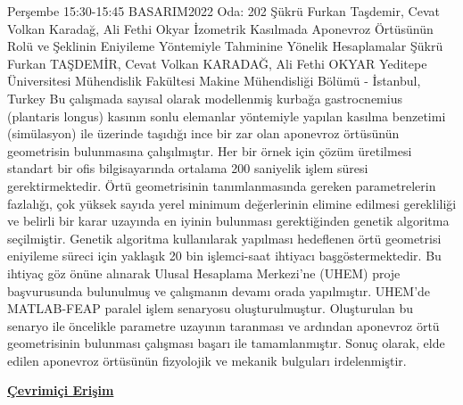 
    \begin{abstract_basarim}
    {Perşembe 15:30-15:45}
    {BASARIM2022}
    {Oda: 202}
    {Şükrü Furkan Taşdemir, Cevat Volkan Karadağ, Ali Fethi Okyar}
    {İzometrik Kasılmada Aponevroz Örtüsünün Rolü ve Şeklinin Eniyileme Yöntemiyle Tahminine Yönelik Hesaplamalar}
    {%
    Şükrü Furkan TAŞDEMİR, Cevat Volkan KARADAĞ, Ali Fethi OKYAR}
    {%
    }
    {%
    Yeditepe Üniversitesi Mühendislik Fakültesi Makine Mühendisliği Bölümü - İstanbul, Turkey}
    Bu çalışmada sayısal olarak modellenmiş kurbağa gastrocnemius (plantaris longus) kasının sonlu elemanlar yöntemiyle yapılan kasılma benzetimi (simülasyon) ile üzerinde taşıdığı ince bir zar olan aponevroz örtüsünün geometrisin bulunmasına çalışılmıştır. Her bir örnek için çözüm üretilmesi standart bir ofis bilgisayarında ortalama 200 saniyelik işlem süresi gerektirmektedir. Örtü geometrisinin tanımlanmasında gereken parametrelerin fazlalığı, çok yüksek sayıda yerel minimum değerlerinin elimine edilmesi gerekliliği ve belirli bir karar uzayında en iyinin bulunması gerektiğinden genetik algoritma seçilmiştir. Genetik algoritma kullanılarak yapılması hedeflenen örtü geometrisi eniyileme süreci için yaklaşık 20 bin işlemci-saat ihtiyacı başgöstermektedir. Bu ihtiyaç göz önüne alınarak Ulusal Hesaplama Merkezi’ne (UHEM) proje başvurusunda bulunulmuş ve çalışmanın devamı orada yapılmıştır. UHEM’de MATLAB-FEAP paralel işlem senaryosu oluşturulmuştur. Oluşturulan bu senaryo ile öncelikle parametre uzayının taranması ve ardından aponevroz örtü geometrisinin bulunması çalışması başarı ile tamamlanmıştır. Sonuç olarak, elde edilen aponevroz örtüsünün fizyolojik ve mekanik bulguları irdelenmiştir. 
    
     \newline\newline\noindent \href{https://drive.google.com/file/d/1lTp_PZwjoVxHZTKNfq1FA31uPwH7xrcq/view?usp=drivesdk}{\bfseries Çevrimiçi Erişim}
    \end{abstract_basarim}
    